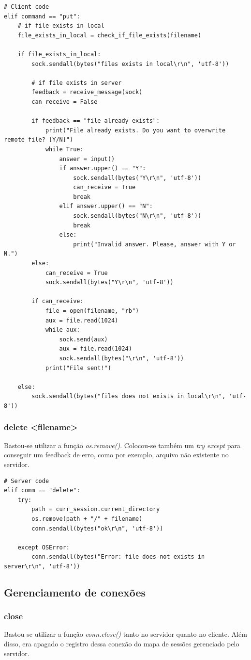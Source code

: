 \documentclass[conference]{IEEEtran}
\begin{document}
\begin{lstlisting}
# Client code
elif command == "put":
	# if file exists in local
	file_exists_in_local = check_if_file_exists(filename)

	if file_exists_in_local:
		sock.sendall(bytes("files exists in local\r\n", 'utf-8'))
		
		# if file exists in server
		feedback = receive_message(sock)
		can_receive = False

		if feedback == "file already exists":
			print("File already exists. Do you want to overwrite remote file? [Y/N]")
			while True:
				answer = input()
				if answer.upper() == "Y":
					sock.sendall(bytes("Y\r\n", 'utf-8'))
					can_receive = True
					break
				elif answer.upper() == "N":
					sock.sendall(bytes("N\r\n", 'utf-8'))
					break
				else:
					print("Invalid answer. Please, answer with Y or N.")
		else:
			can_receive = True
			sock.sendall(bytes("Y\r\n", 'utf-8'))

		if can_receive:
			file = open(filename, "rb")
			aux = file.read(1024)
			while aux:
				sock.send(aux)
				aux = file.read(1024)
				sock.sendall(bytes("\r\n", 'utf-8'))
			print("File sent!")

	else:
		sock.sendall(bytes("files does not exists in local\r\n", 'utf-8'))
\end{lstlisting}

\subsubsection{delete <filename>} Bastou-se utilizar a função \textit{os.remove()}. Colocou-se também um \textit{try except} para conseguir um feedback de erro, como por exemplo, arquivo não existente no servidor.

\begin{lstlisting}
# Server code
elif comm == "delete":
	try:
		path = curr_session.current_directory
	    os.remove(path + "/" + filename)
	    conn.sendall(bytes("ok\r\n", 'utf-8'))

	except OSError:
	    conn.sendall(bytes("Error: file does not exists in server\r\n", 'utf-8'))
\end{lstlisting}

\subsection{Gerenciamento de conexões}

\subsubsection{close} Bastou-se utilizar a função \textit{conn.close()} tanto no servidor quanto no cliente. Além disso, era apagado o registro dessa conexão do mapa de sessões gerenciado pelo servidor.
\end{document}
